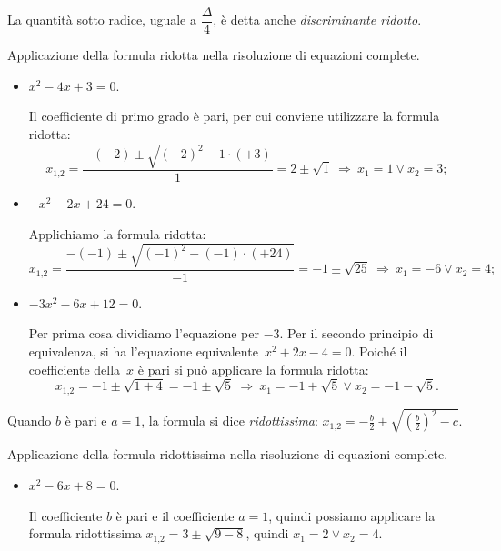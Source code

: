 La quantità sotto radice, uguale a $\dfrac{\Delta}{4}$, è detta anche \emph{discriminante ridotto}.
\begin{exrig}
\begin{esempio}
 Applicazione della formula ridotta nella risoluzione di equazioni complete.
\begin{itemize}
\item $x^{2} - 4 x + 3=0$.

 Il coefficiente di primo grado è pari, per cui conviene utilizzare la formula ridotta: 
\[x_{1\text{,}2}=\frac{-(-2 ) \pm \sqrt{(-2)^{2}-1\cdot(+3)}}{1}=2 \pm \sqrt{1}\:\Rightarrow\:  x_{1} = 1 \vee x_{2} = 3;\]
\item $- x^{2} - 2 x + 24=0$.

 Applichiamo la formula ridotta: 
\[x_{1\text{,}2}=\frac{- ( - 1 ) \pm \sqrt{( -1 )^{2} - (-1)\cdot(+24)}}{-1}=- 1 \pm \sqrt{25}\:\Rightarrow\: x_{1} = - 6 \vee x_{2} = 4;\]
\item $- 3 x^{2} - 6 x + 12=0$.

 Per prima cosa dividiamo l'equazione per $- 3$. Per il secondo principio di equivalenza, si ha l'equazione equivalente~$x^{2} + 2 x - 4=0$. Poiché il coefficiente della~$x$ è pari si può applicare la formula ridotta: 
\[x_{1\text{,}2}=- 1 \pm \sqrt{1 + 4} = - 1\pm \sqrt{5}\:\Rightarrow\: x_{1} = - 1 + \sqrt{5} \vee x_{2} = - 1 - \sqrt{5}.\]
\end{itemize}
\end{esempio}
\end{exrig}

Quando $b$ è pari e $a = 1$, la formula si dice \emph{ridottissima}: $x_{1\text{,}2}=-\frac{b}{2} \pm \sqrt{\left( \frac{b}{2} \right)^{2} - c}$.
\begin{exrig}
\begin{esempio}
 Applicazione della formula ridottissima nella risoluzione di equazioni complete.
\begin{itemize}
\item $x^{2} - 6 x + 8 = 0$.

Il coefficiente $b$ è pari e il coefficiente $a=1$, quindi possiamo applicare la formula ridottissima $x_{1\text{,}2} = 3 \pm \sqrt{9 - 8}$, quindi $x_{1}=2 \vee x_{2} = 4$.
\end{itemize}
\end{esempio}
\end{exrig}
\vspazio\ovalbox{\risolvii  \ref{ese:3.14}, \ref{ese:3.15}} %

